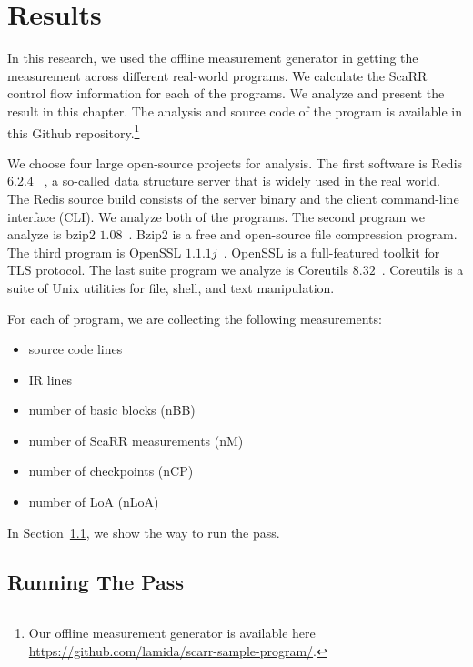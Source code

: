 
\chapter{Results} %

\label{Chapter5} %

In this research, we used the offline measurement generator in getting the
measurement across different real-world programs. We calculate the ScaRR control
flow information for each of the programs. We analyze and present the result in
this chapter. The analysis and source code of the program is available in this
Github repository.\footnote{Our offline measurement generator is available here 
\url{https://github.com/lamida/scarr-sample-program/}.}

We choose four large open-source projects for analysis. The first software is
Redis $6.2.4$ ~\cite{RedisRedis2021}, a so-called data structure server that is
widely used in the real world. The Redis source build consists of the server
binary and the client command-line interface (CLI). We analyze both of the
programs. The second program we analyze is bzip2 $1.08$~\cite{Bzip2Bzip2}. Bzip2
is a free and open-source file compression program. The third program is OpenSSL
$1.1.1j$~\cite{OpensslOpenssl2021}. OpenSSL is a full-featured toolkit for TLS
protocol. The last suite program we analyze is Coreutils
$8.32$~\cite{CoreutilsCoreutils2021}. Coreutils is a suite of Unix utilities for
file, shell, and text manipulation.

For each of program, we are collecting the following measurements:

\begin{itemize}
    \item source code lines
    \item IR lines
    \item number of basic blocks (nBB)
    \item number of ScaRR measurements (nM)
    \item number of checkpoints (nCP)
    \item number of LoA (nLoA)
\end{itemize}

In Section~\ref{sec:running-the-pass}, we show the way to run the pass.

\section{Running The Pass}
\label{sec:running-the-pass}

